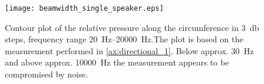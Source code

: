 \begin{figure}[H]
	\centering
	\texttt{[image: beamwidth\_single\_speaker.eps]}
	\caption{Contour plot of the relative pressure along the circumference in \SI{3}{\decibel} steps, frequency range \SIrange{20}{20000}{\hertz}.The plot is based on the measurement performed in \autoref{ax:directional_1}. Below approx. \SI{30}{\hertz} and above approx. \SI{10000}{\hertz} the measurement appears to be compromised by noise.}
		\label{fig:beamwidth_offset_4.5_cm}
\end{figure}